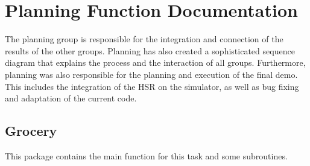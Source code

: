 \documentclass[main.tex]{subfiles}
\begin{document}
	\begingroup

	\renewcommand{\cleardoublepage}{}

	\renewcommand{\clearpage}{}
	
	\newpage

	\chapter{Planning Function Documentation}

		
		The planning group is responsible for the integration and connection of the results of the other groups. Planning has also created a sophisticated sequence diagram that explains the process and the interaction of all groups.
	    Furthermore, planning was also responsible for the planning and execution of the final demo. This includes the integration of the HSR on the simulator, as well as bug fixing and adaptation of the current code.
		
		\section{Grocery}
		\label{grocery}
		This package contains the main function for this task and some subroutines.
\end{document}
